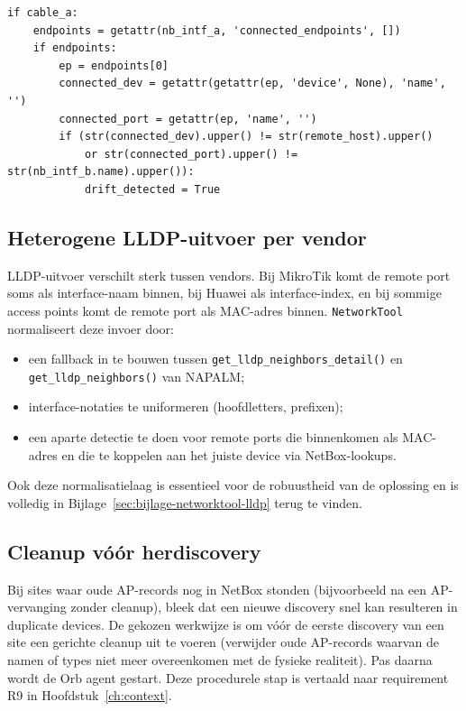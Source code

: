 \begin{listing}[H]
  \caption{Kabel-drift detecteren in NetworkTool (volledige logica in bijlage)}
  \label{lst:cable-drift-cherry}
  \begin{verbatim}
if cable_a:
    endpoints = getattr(nb_intf_a, 'connected_endpoints', [])
    if endpoints:
        ep = endpoints[0]
        connected_dev = getattr(getattr(ep, 'device', None), 'name', '')
        connected_port = getattr(ep, 'name', '')
        if (str(connected_dev).upper() != str(remote_host).upper()
            or str(connected_port).upper() != str(nb_intf_b.name).upper()):
            drift_detected = True
  \end{verbatim}
\end{listing}

\subsection{Heterogene LLDP-uitvoer per vendor}

LLDP-uitvoer verschilt sterk tussen vendors. Bij MikroTik komt de remote port soms als interface-naam binnen, bij Huawei als interface-index, en bij sommige access points komt de remote port als MAC-adres binnen. \texttt{NetworkTool} normaliseert deze invoer door:

\begin{itemize}
  \item een fallback in te bouwen tussen \texttt{get\_lldp\_neighbors\_detail()} en \texttt{get\_lldp\_neighbors()} van NAPALM;\autocite{NAPALM}
  \item interface-notaties te uniformeren (hoofdletters, prefixen);
  \item een aparte detectie te doen voor remote ports die binnenkomen als MAC-adres en die te koppelen aan het juiste device via NetBox-lookups.
\end{itemize}

Ook deze normalisatielaag is essentieel voor de robuustheid van de oplossing en is volledig in Bijlage~\ref{sec:bijlage-networktool-lldp} terug te vinden.

\subsection{Cleanup vóór herdiscovery}

Bij sites waar oude AP-records nog in NetBox stonden (bijvoorbeeld na een AP-vervanging zonder cleanup), bleek dat een nieuwe discovery snel kan resulteren in duplicate devices. De gekozen werkwijze is om vóór de eerste discovery van een site een gerichte cleanup uit te voeren (verwijder oude AP-records waarvan de namen of types niet meer overeenkomen met de fysieke realiteit). Pas daarna wordt de Orb agent gestart. Deze procedurele stap is vertaald naar requirement R9 in Hoofdstuk~\ref{ch:context}.

